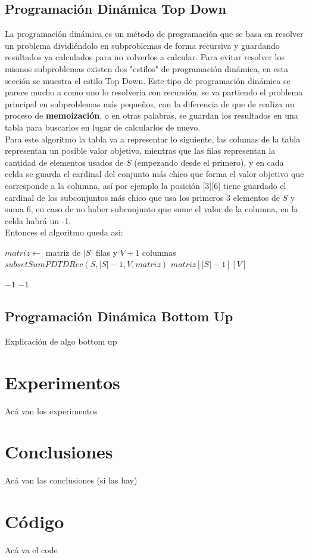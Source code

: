 \documentclass[a4paper]{article}
\begin{document}
\subsection{Programaci\'on Din\'amica Top Down}
La programación dinámica es un método de programación que se basa en resolver un problema dividiéndolo en subproblemas de forma recursiva y guardando resultados ya calculados para no volverlos a calcular. Para evitar resolver los mismos subproblemas existen dos "estilos" de programación dinámica, en esta sección se muestra el estilo Top Down.
Este tipo de programación dinámica se parece mucho a como uno lo resolveria con recursión, se va partiendo el problema principal en subproblemas más pequeños, con la diferencia de que de realiza un proceso de \textbf{memoización}, o en otras palabras, se guardan los resultados en una tabla para buscarlos en lugar de calcularlos de nuevo.
\\
Para este algoritmo la tabla va a representar lo siguiente, las columas de la tabla representan un posible valor objetivo, mientras que las filas representan la cantidad de elementos usados de $S$ (empezando desde el primero), y en cada celda se guarda el cardinal del conjunto más chico que forma el valor objetivo que corresponde a la columna, así por ejemplo la posición [3][6] tiene guardado el cardinal de los subconjuntos más chico que usa los primeros 3 elementos de $S$ y suma $6$, en caso de no haber subconjunto que sume el valor de la columna, en la celda habrá un -1.
\\
Entonces el algoritmo queda asi:

\begin{algorithm}
\begin{algorithmic}
		\State $matriz \gets$ matriz de $|S|$ filas y $V+1$ columnas 
		\State $subsetSumPDTDRec(S, |S|-1, V, matriz)$ 
		\State \Return $matriz[|S|-1][V]$
	\EndProcedure
\end{algorithmic}
\end{algorithm}

\begin{algorithm}
\begin{algorithmic}
	 
			\State \Return $-1$
		\EndIf
			\State \Return $-1$
		\EndIf
		\If{}
		\EndIf
		\If{}
		\EndIf
		\If{}
		\EndIf
	\EndProcedure
\end{algorithmic}
\end{algorithm}


\subsection{Programaci\'on Din\'amica Bottom Up}
Explicación de algo bottom up
\section{Experimentos}
Acá van los experimentos
\section{Conclusiones}
Acá van las conclusiones (si las hay)
\section{Código}
Acá va el code
\end{document}
